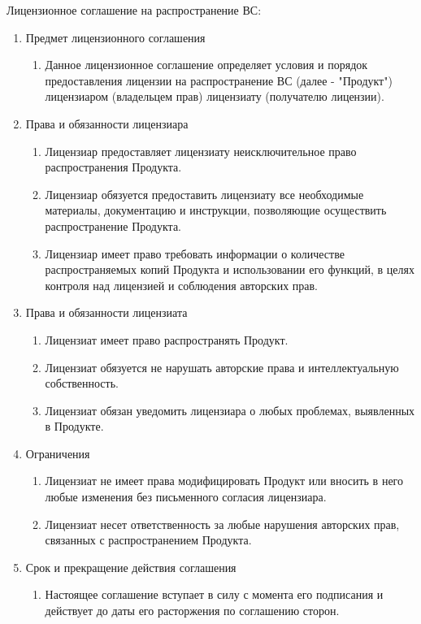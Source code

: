 \documentclass[a4paper, 14pt] {extarticle}
\begin{document}
Лицензионное соглашение на распространение ВС:
\begin{enumerate} 
\item Предмет лицензионного соглашения
	\begin{enumerate}
	\item Данное лицензионное соглашение определяет условия и порядок предоставления лицензии на распространение ВС (далее - "Продукт") лицензиаром (владельцем прав) лицензиату (получателю лицензии).
	\end{enumerate}
\item Права и обязанности лицензиара
	\begin{enumerate}
	\item Лицензиар предоставляет лицензиату неисключительное право распространения Продукта.
	\item Лицензиар обязуется предоставить лицензиату все необходимые материалы, документацию и инструкции, позволяющие осуществить распространение Продукта.
	\item Лицензиар имеет право требовать информации о количестве распространяемых копий Продукта и использовании его функций, в целях контроля над лицензией и соблюдения авторских прав.
	\end{enumerate}
\item Права и обязанности лицензиата
	\begin{enumerate}
	\item Лицензиат имеет право распространять Продукт.
	\item Лицензиат обязуется не нарушать авторские права и интеллектуальную собственность.
	\item Лицензиат обязан уведомить лицензиара о любых проблемах, выявленных в Продукте.
	\end{enumerate}
\item Ограничения
	\begin{enumerate}
	\item Лицензиат не имеет права модифицировать Продукт или вносить в него любые изменения без письменного согласия лицензиара.
	\item Лицензиат несет ответственность за любые нарушения авторских прав, связанных с распространением Продукта.
	\end{enumerate}
\item Срок и прекращение действия соглашения
	\begin{enumerate}
	\item Настоящее соглашение вступает в силу с момента его подписания и действует до даты его расторжения по соглашению сторон.

\end{enumerate}
\end{enumerate}
\end{document}

